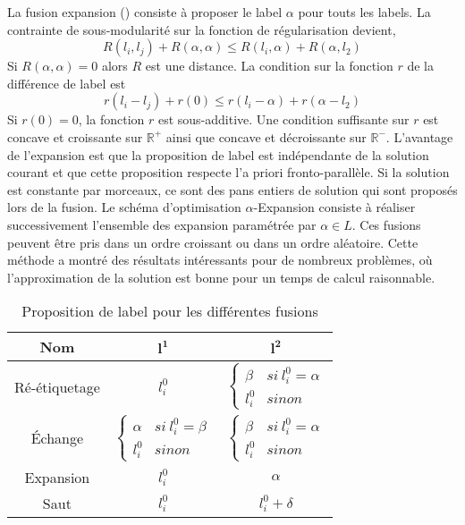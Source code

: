 \documentclass[../main/These_Mathias_Paget.tex]{subfiles}
\begin{document}
La fusion expansion (\cite{Veksler99t}) consiste à proposer le label $\alpha$ pour touts les labels. La contrainte de sous-modularité sur la fonction de régularisation devient,
	\begin{equation}
	R(l_i,l_j) + R(\alpha,\alpha) \leq R(l_i,\alpha) + R(\alpha,l_2)	
	\end{equation}
	Si $R(\alpha,\alpha)=0$ alors $R$ est une distance. La condition sur la fonction $r$ de la différence de label est
	\begin{equation}
	r(l_i-l_j) + r(0) \leq r(l_i-\alpha) + r(\alpha-l_2)	
	\end{equation}
	Si $r(0)=0$, la fonction $r$ est sous-additive. Une condition suffisante sur $r$ est concave et croissante sur $\mathbb{R}^+$ ainsi que concave et décroissante sur $\mathbb{R}^-$. L’avantage de l'expansion est que la proposition de label est indépendante de la solution courant et que cette proposition respecte l'a priori fronto-parallèle. Si la solution est constante par morceaux, ce sont des pans entiers de solution qui sont proposés lors de la fusion.
	Le schéma d'optimisation  $\alpha$-Expansion consiste à réaliser successivement l'ensemble des expansion paramétrée par $\alpha \in L$. Ces fusions peuvent être pris dans un ordre croissant ou dans un ordre aléatoire. Cette méthode a montré des résultats intéressants pour de nombreux problèmes, où l'approximation de la solution est bonne pour un temps de calcul raisonnable.

\begin{table}
\begin{center}
\begin{tabular}{c|cc}
\hline
Nom & $\boldsymbol{l^1}$ & $\boldsymbol{l^2}$ \\
\hline
Ré-étiquetage & $l_{i}^{0}$ &  $\left\{\begin{array}{cc} \beta & si\:l_{i}^{0}=\alpha  \\  l_{i}^{0} & sinon \end{array}  \right. $ \\
Échange & $\left\{\begin{array}{cc} \alpha & si\:l_{i}^{0}=\beta  \\  l_{i}^{0} & sinon \end{array}  \right. $ &  $\left\{\begin{array}{cc} \beta & si\:l_{i}^{0}=\alpha  \\  l_{i}^{0} & sinon \end{array}  \right. $ \\ 
Expansion & $l_{i}^{0}$ & $\alpha$ \\
Saut & $l_{i}^{0}$ & $l_{i}^{0}+\delta$ \\
\end{tabular}
\end{center}
\caption{Proposition de label pour les différentes fusions}
\label{tab:fusion}
\end{table}
\end{document}
